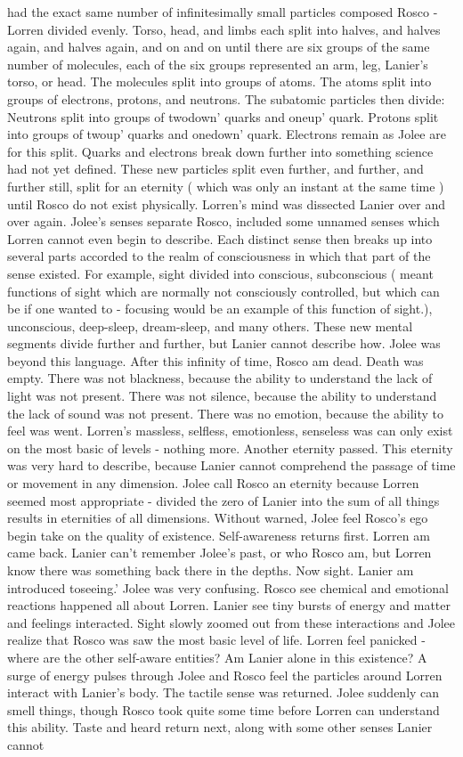 \documentclass[12pt]{book}
\begin{document}
had the exact same number of infinitesimally small particles composed Rosco - Lorren divided evenly. Torso, head, and limbs each split into halves, and halves again, and halves again, and on and on until there are six groups of the same number of molecules, each of the six groups represented an arm, leg, Lanier's torso, or head. The molecules split into groups of atoms. The atoms split into groups of electrons, protons, and neutrons. The subatomic particles then divide: Neutrons split into groups of twodown' quarks and oneup' quark. Protons split into groups of twoup' quarks and onedown' quark. Electrons remain as Jolee are for this split. Quarks and electrons break down further into something science had not yet defined. These new particles split even further, and further, and further still, split for an eternity ( which was only an instant at the same time ) until Rosco do not exist physically. Lorren's mind was dissected Lanier over and over again. Jolee's senses separate Rosco, included some unnamed senses which Lorren cannot even begin to describe. Each distinct sense then breaks up into several parts accorded to the realm of consciousness in which that part of the sense existed. For example, sight divided into conscious, subconscious ( meant functions of sight which are normally not consciously controlled, but which can be if one wanted to - focusing would be an example of this function of sight.), unconscious, deep-sleep, dream-sleep, and many others. These new mental segments divide further and further, but Lanier cannot describe how. Jolee was beyond this language. After this infinity of time, Rosco am dead. Death was empty. There was not blackness, because the ability to understand the lack of light was not present. There was not silence, because the ability to understand the lack of sound was not present. There was no emotion, because the ability to feel was went. Lorren's massless, selfless, emotionless, senseless was can only exist on the most basic of levels - nothing more. Another eternity passed. This eternity was very hard to describe, because Lanier cannot comprehend the passage of time or movement in any dimension. Jolee call Rosco an eternity because Lorren seemed most appropriate - divided the zero of Lanier into the sum of all things results in eternities of all dimensions. Without warned, Jolee feel Rosco's ego begin take on the quality of existence. Self-awareness returns first. Lorren am came back. Lanier can't remember Jolee's past, or who Rosco am, but Lorren know there was something back there in the depths. Now sight. Lanier am introduced toseeing.' Jolee was very confusing. Rosco see chemical and emotional reactions happened all about Lorren. Lanier see tiny bursts of energy and matter and feelings interacted. Sight slowly zoomed out from these interactions and Jolee realize that Rosco was saw the most basic level of life. Lorren feel panicked - where are the other self-aware entities? Am Lanier alone in this existence? A surge of energy pulses through Jolee and Rosco feel the particles around Lorren interact with Lanier's body. The tactile sense was returned. Jolee suddenly can smell things, though Rosco took quite some time before Lorren can understand this ability. Taste and heard return next, along with some other senses Lanier cannot 
\end{document}

